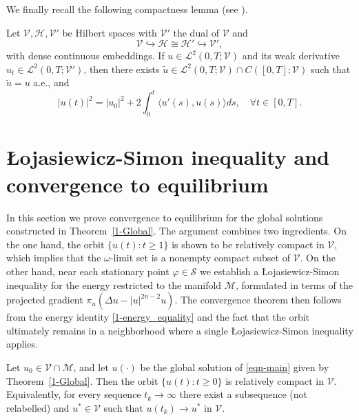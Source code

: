 \documentclass[reqno]{amsart}
\begin{document}
We finally recall the following compactness lemma
(see \cite[Chapter~3, Lemma~1.2]{Temam}).

\begin{lemma} \label{1-tem}
Let $\mathcal{V}, \mathcal{H}, \mathcal{V}'$ be Hilbert spaces with $\mathcal{V}'$
the dual of $\mathcal{V}$ and
\[
\mathcal{V} \hookrightarrow \mathcal{H} \cong \mathcal{H}'
\hookrightarrow \mathcal{V}',
\]
with dense continuous embeddings. If $u \in \mathcal{L}^{2}(0,T;\mathcal{V})$ and its
weak derivative $u_t \in \mathcal{L}^{2}(0,T;\mathcal{V}')$, then there exists
$\tilde{u} \in \mathcal{L}^{2}(0,T;\mathcal{V}) \cap C([0,T];\mathcal{V})$ such that
$\tilde{u} = u$ a.e., and
\[
| u(t) |^{2} = | u_{0} |^{2} + 2 \int_{0}^{t} \langle u'(s), u(s) \rangle  ds, \quad
\forall t \in [0,T].
\]
\end{lemma}

\section{\L{o}jasiewicz-Simon inequality and convergence to equilibrium}

In this section we prove convergence to equilibrium for the global solutions constructed
in Theorem~\ref{1-Global}. The argument combines two ingredients. On the one hand, the
orbit $\{u(t):t\ge 1\}$ is shown to be relatively compact in $\mathcal{V}$, which
implies that the $\omega$-limit set is a nonempty compact subset of $\mathcal{V}$.
On the other hand, near each stationary point $\varphi\in\mathcal{S}$ we establish
a \L{o}jasiewicz-Simon inequality for the energy restricted to the manifold
$\mathcal{M}$, formulated in terms of the projected gradient
$\pi_u(\Delta u-|u|^{2n-2}u)$. The convergence theorem then follows from the energy
identity \eqref{1-energy_equality} and the fact that the orbit ultimately remains in
a neighborhood where a single \L{o}jasiewicz-Simon inequality applies.


\begin{theorem}\label{thm:precompact}
Let $u_0\in \mathcal V\cap\mathcal M$, and let $u(\cdot)$ be the global solution of
\eqref{eqn-main} given by Theorem~\ref{1-Global}. Then the orbit $\{u(t): t\ge 0\}$
is relatively compact in $\mathcal V$. Equivalently, for every sequence $t_k\to\infty$
there exist a subsequence (not relabelled) and $u^\ast\in\mathcal V$ such that
$u(t_k)\to u^\ast$ in $\mathcal V$.
\end{theorem}
\end{document}
